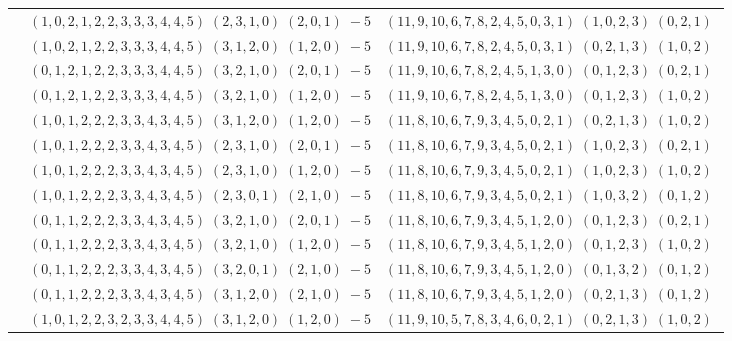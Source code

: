 \documentclass[11pt]{article}
\begin{document}
\begin{longtable}[l]{|c|c|c|}
 \cline{2-3} 
 & $(1 ,0 ,2 ,1 ,2 ,2 ,3 ,3 ,3 ,4 ,4 ,5) \;(2 ,3 ,1 ,0) \;(2 ,0 ,1) \;-5$ & $(11 ,9 ,10 ,6 ,7 ,8 ,2 ,4 ,5 ,0 ,3 ,1) \;(1 ,0 ,2 ,3) \;(0 ,2 ,1) \;$\\ 
 \cline{2-3} 
 & $(1 ,0 ,2 ,1 ,2 ,2 ,3 ,3 ,3 ,4 ,4 ,5) \;(3 ,1 ,2 ,0) \;(1 ,2 ,0) \;-5$ & $(11 ,9 ,10 ,6 ,7 ,8 ,2 ,4 ,5 ,0 ,3 ,1) \;(0 ,2 ,1 ,3) \;(1 ,0 ,2) \;$\\ 
 \cline{2-3} 
 & $(0 ,1 ,2 ,1 ,2 ,2 ,3 ,3 ,3 ,4 ,4 ,5) \;(3 ,2 ,1 ,0) \;(2 ,0 ,1) \;-5$ & $(11 ,9 ,10 ,6 ,7 ,8 ,2 ,4 ,5 ,1 ,3 ,0) \;(0 ,1 ,2 ,3) \;(0 ,2 ,1) \;$\\ 
 \cline{2-3} 
 & $(0 ,1 ,2 ,1 ,2 ,2 ,3 ,3 ,3 ,4 ,4 ,5) \;(3 ,2 ,1 ,0) \;(1 ,2 ,0) \;-5$ & $(11 ,9 ,10 ,6 ,7 ,8 ,2 ,4 ,5 ,1 ,3 ,0) \;(0 ,1 ,2 ,3) \;(1 ,0 ,2) \;$\\ 
 \cline{2-3} 
 & $(1 ,0 ,1 ,2 ,2 ,2 ,3 ,3 ,4 ,3 ,4 ,5) \;(3 ,1 ,2 ,0) \;(1 ,2 ,0) \;-5$ & $(11 ,8 ,10 ,6 ,7 ,9 ,3 ,4 ,5 ,0 ,2 ,1) \;(0 ,2 ,1 ,3) \;(1 ,0 ,2) \;$\\ 
 \cline{2-3} 
 & $(1 ,0 ,1 ,2 ,2 ,2 ,3 ,3 ,4 ,3 ,4 ,5) \;(2 ,3 ,1 ,0) \;(2 ,0 ,1) \;-5$ & $(11 ,8 ,10 ,6 ,7 ,9 ,3 ,4 ,5 ,0 ,2 ,1) \;(1 ,0 ,2 ,3) \;(0 ,2 ,1) \;$\\ 
 \cline{2-3} 
 & $(1 ,0 ,1 ,2 ,2 ,2 ,3 ,3 ,4 ,3 ,4 ,5) \;(2 ,3 ,1 ,0) \;(1 ,2 ,0) \;-5$ & $(11 ,8 ,10 ,6 ,7 ,9 ,3 ,4 ,5 ,0 ,2 ,1) \;(1 ,0 ,2 ,3) \;(1 ,0 ,2) \;$\\ 
 \cline{2-3} 
 & $(1 ,0 ,1 ,2 ,2 ,2 ,3 ,3 ,4 ,3 ,4 ,5) \;(2 ,3 ,0 ,1) \;(2 ,1 ,0) \;-5$ & $(11 ,8 ,10 ,6 ,7 ,9 ,3 ,4 ,5 ,0 ,2 ,1) \;(1 ,0 ,3 ,2) \;(0 ,1 ,2) \;$\\ 
 \cline{2-3} 
 & $(0 ,1 ,1 ,2 ,2 ,2 ,3 ,3 ,4 ,3 ,4 ,5) \;(3 ,2 ,1 ,0) \;(2 ,0 ,1) \;-5$ & $(11 ,8 ,10 ,6 ,7 ,9 ,3 ,4 ,5 ,1 ,2 ,0) \;(0 ,1 ,2 ,3) \;(0 ,2 ,1) \;$\\ 
 \cline{2-3} 
 & $(0 ,1 ,1 ,2 ,2 ,2 ,3 ,3 ,4 ,3 ,4 ,5) \;(3 ,2 ,1 ,0) \;(1 ,2 ,0) \;-5$ & $(11 ,8 ,10 ,6 ,7 ,9 ,3 ,4 ,5 ,1 ,2 ,0) \;(0 ,1 ,2 ,3) \;(1 ,0 ,2) \;$\\ 
 \cline{2-3} 
 & $(0 ,1 ,1 ,2 ,2 ,2 ,3 ,3 ,4 ,3 ,4 ,5) \;(3 ,2 ,0 ,1) \;(2 ,1 ,0) \;-5$ & $(11 ,8 ,10 ,6 ,7 ,9 ,3 ,4 ,5 ,1 ,2 ,0) \;(0 ,1 ,3 ,2) \;(0 ,1 ,2) \;$\\ 
 \cline{2-3} 
 & $(0 ,1 ,1 ,2 ,2 ,2 ,3 ,3 ,4 ,3 ,4 ,5) \;(3 ,1 ,2 ,0) \;(2 ,1 ,0) \;-5$ & $(11 ,8 ,10 ,6 ,7 ,9 ,3 ,4 ,5 ,1 ,2 ,0) \;(0 ,2 ,1 ,3) \;(0 ,1 ,2) \;$\\ 
 \cline{2-3} 
 & $(1 ,0 ,1 ,2 ,2 ,3 ,2 ,3 ,3 ,4 ,4 ,5) \;(3 ,1 ,2 ,0) \;(1 ,2 ,0) \;-5$ & $(11 ,9 ,10 ,5 ,7 ,8 ,3 ,4 ,6 ,0 ,2 ,1) \;(0 ,2 ,1 ,3) \;(1 ,0 ,2) \;$\\ 

\end{longtable}
\end{document}
